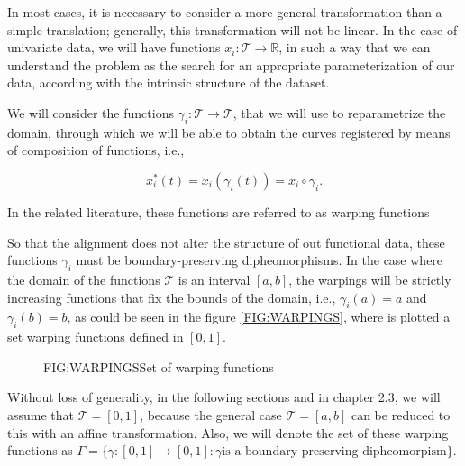 In most cases, it is necessary to consider a more general transformation than a
simple translation; generally, this transformation will not be linear. In the
case of univariate data, we will have functions
$x_i: \mathcal{T} \rightarrow \mathbb{R}$, in such a way that we can understand
the problem as the search for an appropriate parameterization of our data,
according with the intrinsic structure of the dataset.

We will consider the functions $\gamma_i: \mathcal{T} \rightarrow \mathcal{T}$,
that we will use to reparametrize the domain, through which we will be able to
obtain the curves registered by means of composition of functions, i.e.,

$$
x_i^*(t)=x_i(\gamma_i(t)) = x_i \circ \gamma _i.
$$

In the related literature, these functions are referred to as warping functions

So that the alignment does not alter the structure of out functional data,
these functions $\gamma_i$ must be boundary-preserving dipheomorphisms. In the
case where the domain of the functions $\mathcal{T}$ is an interval $[a,b]$, the
warpings will be strictly increasing functions that fix the bounds of the
domain, i.e., $\gamma_i(a)=a$ and $\gamma_i(b)=b$, as could be seen in the
figure \ref{FIG:WARPINGS}, where is plotted a set warping functions defined in
$[0,1]$.

\begin{figure}[Set of warping functions]{FIG:WARPINGS}{Set of warping functions}
\end{figure}


Without loss of generality, in the following sections and in chapter 2.3, we
will assume that $\mathcal{T}=[0,1]$, because the general case
$\mathcal{T}=[a,b]$ can be reduced to this with an affine transformation. Also,
we will denote the set of these warping functions as
$\Gamma = \{ \gamma:[0, 1]\rightarrow [0,1] : \gamma
\text{is a boundary-preserving dipheomorpism} \}$.
